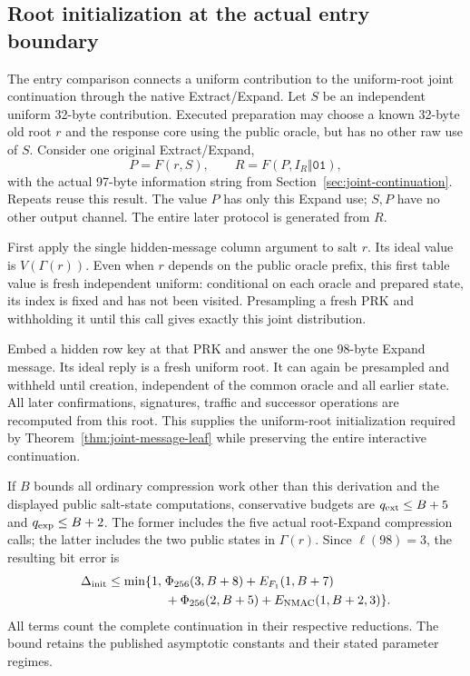 \subsection{Root initialization at the actual entry boundary}
\label{app:joint-root-entry}

The entry comparison connects a uniform contribution to the uniform-root
joint continuation through the native Extract/Expand. Let $S$ be an
independent uniform 32-byte contribution. Executed
preparation may choose a known 32-byte old root $r$ and the response
core using the public oracle, but has no other raw use of $S$. Consider
one original Extract/Expand,
\[
 P=F(r,S),\qquad R=F(P,I_R\Vert\mathtt{01}),
\]
with the actual 97-byte information string from
Section~\ref{sec:joint-continuation}. Repeats reuse this result.
The value $P$ has only this Expand use; $S,P$ have no other output
channel. The entire later protocol is generated from $R$.

First apply the single hidden-message column argument to salt $r$.
Its ideal value is $V(\Gamma(r))$. Even when $r$ depends on the public
oracle prefix, this first table value is fresh independent uniform:
conditional on each oracle and prepared state, its index is fixed and
has not been visited. Presampling a fresh PRK and withholding it until
this call gives exactly this joint distribution.

Embed a hidden row key at that PRK and answer the one 98-byte Expand
message. Its ideal reply is a fresh uniform root. It can again be
presampled and withheld until creation, independent of the common
oracle and all earlier state. All later confirmations, signatures,
traffic and successor operations are recomputed from this root.
This supplies the uniform-root initialization required by
Theorem~\ref{thm:joint-message-leaf} while preserving the entire interactive
continuation.

If $B$ bounds all ordinary compression work other than this derivation
and the displayed public salt-state computations, conservative budgets
are $q_{\rm ext}\le B+5$ and $q_{\rm exp}\le B+2$.
The former includes the five actual root-Expand compression calls; the
latter includes the two public states in $\Gamma(r)$.
Since $\ell(98)=3$, the resulting bit error is
\begin{equation}
\begin{split}
 \Delta_{\rm init}\le\min\{1,\;&
 \Phi_{256}(3,B+8)+E_{F_1}(1,B+7)\\
 &+\Phi_{256}(2,B+5)+E_{\rm NMAC}(1,B+2,3)\}.
\end{split}
 \label{eq:appendix-root-initialization}
\end{equation}
All terms count the complete continuation in their respective reductions.
The bound retains the published asymptotic constants and their stated
parameter regimes.

